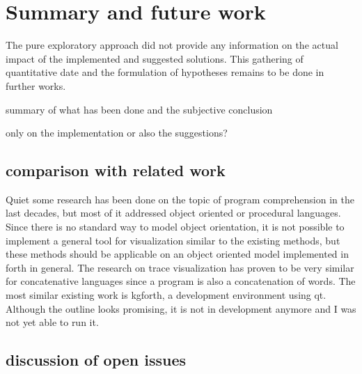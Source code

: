 \chapter{Summary and future work}
\label{chap:Summary}

The pure exploratory approach did not provide any information on the actual impact of the implemented and suggested solutions. This gathering of quantitative date and the formulation of hypotheses remains to be done in further works.

summary of what has been done and the subjective conclusion

only on the implementation or also the suggestions?

\section{comparison with related work}

Quiet some research has been done on the topic of program comprehension in the last decades, but most of it addressed object oriented or procedural languages. Since there is no standard way to model object orientation, it is not possible to implement a general tool for visualization similar to the existing methods, but these methods should be applicable on an object oriented model implemented in forth in general. The research on trace visualization has proven to be very similar for concatenative languages since a program is also a concatenation of words. 
The most similar existing work is kgforth, a development environment using qt. Although the outline looks promising, it is not in development anymore and I was not yet able to run it.

\section{discussion of open issues}

